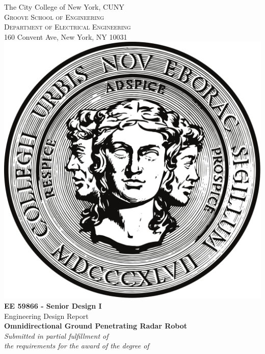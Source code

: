 \begin{titlepage}
	\begin{center}
		\Large{The City College of New York, CUNY}\\
		\normalsize
		\textsc{Groove School of Engineering}\\
		\textsc{Department of Electrical Engineering}\\
		160 Convent Ave, New York, NY 10031 \\
		\includegraphics[scale=0.05]{./images/logo.png}\\
		\vspace{0.5cm}
		\textup{{\bf EE 59866 - Senior Design I} \\ Engineering Design Report}\\[0.2in]
		
		\Large \textbf {Omnidirectional Ground Penetrating Radar Robot}\\[0.5in]
		
		\small \emph{Submitted in partial fulfillment of\\
			the requirements for the award of the degree of}
		\vspace{.2in}
		

\end{center}
\end{titlepage}
